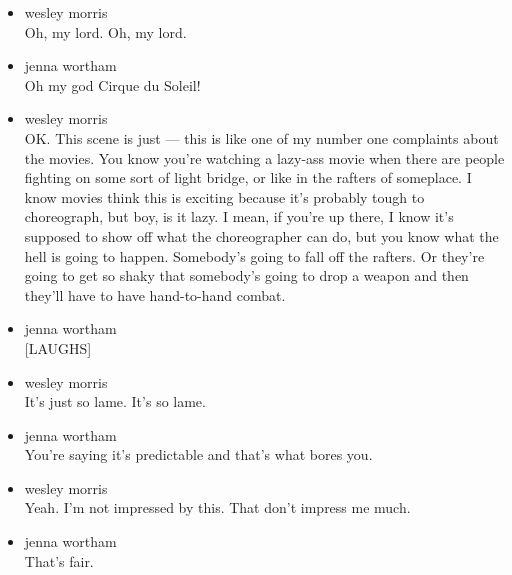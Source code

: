 \begin{itemize}
\item
  wesley morris\\
  Oh, my lord. Oh, my lord.
\item
  jenna wortham\\
  Oh my god Cirque du Soleil!
\item
  wesley morris\\
  OK. This scene is just --- this is like one of my number one
  complaints about the movies. You know you're watching a lazy-ass movie
  when there are people fighting on some sort of light bridge, or like
  in the rafters of someplace. I know movies think this is exciting
  because it's probably tough to choreograph, but boy, is it lazy. I
  mean, if you're up there, I know it's supposed to show off what the
  choreographer can do, but you know what the hell is going to happen.
  Somebody's going to fall off the rafters. Or they're going to get so
  shaky that somebody's going to drop a weapon and then they'll have to
  have hand-to-hand combat.
\item
  jenna wortham\\
  {[}LAUGHS{]}
\item
  wesley morris\\
  It's just so lame. It's so lame.
\item
  jenna wortham\\
  You're saying it's predictable and that's what bores you.
\item
  wesley morris\\
  Yeah. I'm not impressed by this. That don't impress me much.
\item
  jenna wortham\\
  That's fair.


\end{itemize}
